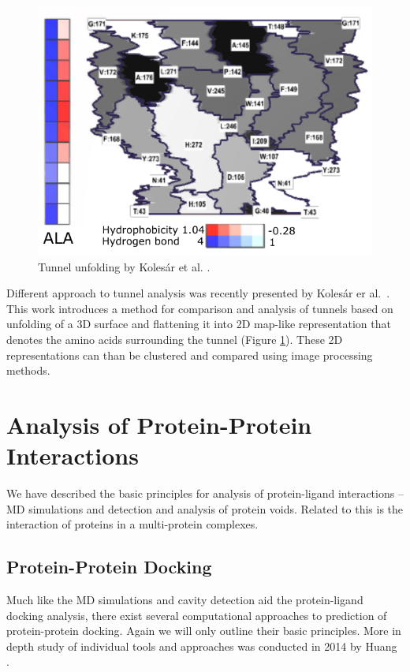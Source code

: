 \begin{figure}
\vspace{-30pt}
  \begin{center}
  \includegraphics[width=\linewidth]{pictures/tunnels4.pdf}
  \vspace{-20pt}
  \caption{Tunnel unfolding by Kolesár et al. \cite{kolesar2016unfolding}.}
  \label{Fig:tunnels3}
  \end{center}  
  \vspace{-25pt}
\end{figure} 

Different approach to tunnel analysis was recently presented by Kolesár er al.~\cite{kolesar2016unfolding}. This work introduces a method for comparison and analysis of tunnels based on unfolding of a 3D surface and flattening it into 2D map-like representation that denotes the amino acids surrounding the tunnel (Figure \ref{Fig:tunnels3}). These 2D representations can than be clustered and compared using image processing methods. 

\section{Analysis of Protein-Protein Interactions}
We have described the basic principles for analysis of protein-ligand interactions -- MD simulations and detection and analysis of protein voids. Related to this is the interaction of proteins in a multi-protein complexes. 

\subsection{Protein-Protein Docking}
Much like the MD simulations and cavity detection aid the protein-ligand docking analysis, there exist several computational approaches to prediction of protein-protein docking. Again we will only outline their basic principles. More in depth study of individual tools and approaches was conducted in 2014 by Huang \cite{huang2014search}.

